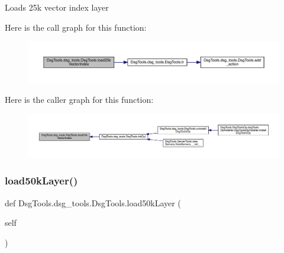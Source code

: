 \begin{DoxyVerb}Loads 25k vector index layer
\end{DoxyVerb}
 Here is the call graph for this function\+:
\nopagebreak
\begin{figure}[H]
\begin{center}
\leavevmode
\includegraphics[width=350pt]{class_dsg_tools_1_1dsg__tools_1_1_dsg_tools_a678ff479d9d170618893e864a6cfecbf_cgraph}
\end{center}
\end{figure}
Here is the caller graph for this function\+:
\nopagebreak
\begin{figure}[H]
\begin{center}
\leavevmode
\includegraphics[width=350pt]{class_dsg_tools_1_1dsg__tools_1_1_dsg_tools_a678ff479d9d170618893e864a6cfecbf_icgraph}
\end{center}
\end{figure}
\mbox{\label{class_dsg_tools_1_1dsg__tools_1_1_dsg_tools_a5e6e11f1f5a55805a7e6e79a6276f6d8}} 
\subsubsection{\texorpdfstring{load50k\+Layer()}{load50kLayer()}}
{\footnotesize\ttfamily def Dsg\+Tools.\+dsg\+\_\+tools.\+Dsg\+Tools.\+load50k\+Layer (\begin{DoxyParamCaption}\item[{}]{self }\end{DoxyParamCaption})}


